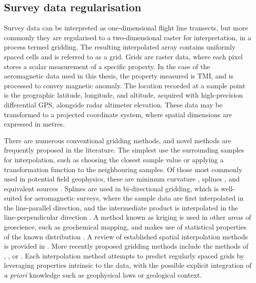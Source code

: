 \subsection{Survey data regularisation}
\label{sec:introgrids}
Survey data can be interpreted as one-dimensional flight line transects, but more commonly they are regularised to a two-dimensional raster for interpretation, in a process termed gridding.
The resulting interpolated array contains uniformly spaced cells and is referred to as a grid.
Grids are raster data, where each pixel stores a scalar measurement of a specific property.
In the case of the aeromagnetic data used in this thesis, the property measured is TMI, and is processed to convey magnetic anomaly.
The location recorded at a sample point is the geographic latitude, longitude, and altitude, acquired with high-precision differential GPS, alongside radar altimeter elevation.
These data may be transformed to a projected coordinate system, where spatial dimensions are expressed in metres.

There are numerous conventional gridding methods, and novel methods are frequently proposed in the literature.
The simplest use the surrounding samples for interpolation, such as choosing the closest sample value or applying a transformation function to the neighbouring samples.
Of those most commonly used in potential field geophysics, these are minimum curvature \parencite{briggsMachineContouringUsing1974}, splines \parencite{bhattacharyyaBicubicSplineInterpolation1969,shureHarmonicSplinesGeomagnetic1982,smithGriddingContinuousCurvature1990}, and equivalent sources \parencite{dampneyEquivalentSourceTechnique1969, solerBetterStrategyInterpolating2020}.
Splines are used in bi-directional gridding, which is well-suited for aeromagnetic surveys, where the sample data are first interpolated in the line-parallel direction, and the intermediate product is interpolated in the line-perpendicular direction \parencite{dentithGeophysicsMineralExploration2014}.
A method known as kriging is used in other areas of geoscience, such as geochemical mapping, and makes use of statistical properties of the known distribution \parencite{hansenInterpretiveGriddingAnisotropic1993,davis1986statistics}.
A review of established spatial interpolation methods is provided in \textcite{liReviewComparativeStudies2011}.
More recently proposed gridding methods include the methods of \textcite{naprstekNewMethodInterpolating2019}, \textcite{xuGravityAnomalyReconstruction2019}, or \textcite{chenPotentialFieldData2022}.
Each interpolation method attempts to predict regularly spaced grids by leveraging properties intrinsic to the data, with the possible explicit integration of \emph{a priori} knowledge such as geophysical laws or geological context.

